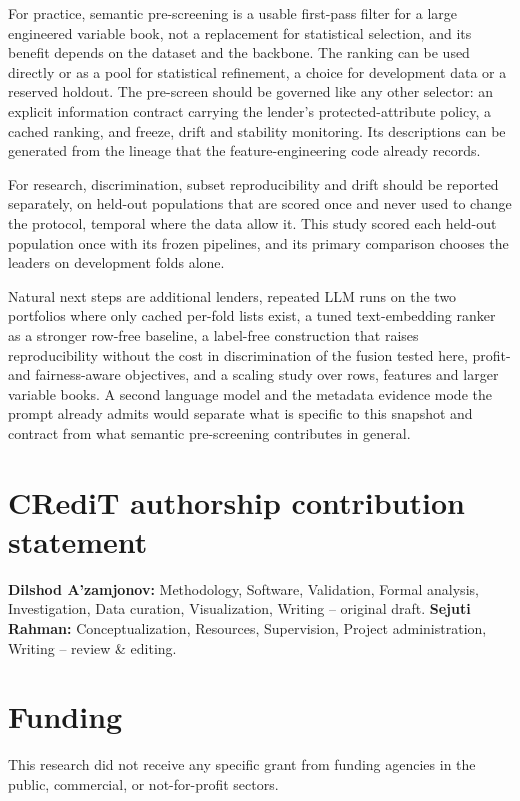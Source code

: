 \documentclass[final,5p,twocolumn]{elsarticle}
\begin{document}
For practice, semantic pre-screening is a usable first-pass filter for a large engineered variable book, not a replacement for statistical selection, and its benefit depends on the dataset and the backbone. The ranking can be used directly or as a pool for statistical refinement, a choice for development data or a reserved holdout. The pre-screen should be governed like any other selector: an explicit information contract carrying the lender's protected-attribute policy, a cached ranking, and freeze, drift and stability monitoring. Its descriptions can be generated from the lineage that the feature-engineering code already records.

For research, discrimination, subset reproducibility and drift should be reported separately, on held-out populations that are scored once and never used to change the protocol, temporal where the data allow it. This study scored each held-out population once with its frozen pipelines, and its primary comparison chooses the leaders on development folds alone.

Natural next steps are additional lenders, repeated LLM runs on the two portfolios where only cached per-fold lists exist, a tuned text-embedding ranker as a stronger row-free baseline, a label-free construction that raises reproducibility without the cost in discrimination of the fusion tested here, profit- and fairness-aware objectives, and a scaling study over rows, features and larger variable books. A second language model and the metadata evidence mode the prompt already admits would separate what is specific to this snapshot and contract from what semantic pre-screening contributes in general.


\section*{CRediT authorship contribution statement}
\textbf{Dilshod A'zamjonov:} Methodology, Software, Validation, Formal analysis, Investigation, Data curation, Visualization, Writing -- original draft. \textbf{Sejuti Rahman:} Conceptualization, Resources, Supervision, Project administration, Writing -- review \& editing.

\section*{Funding}
This research did not receive any specific grant from funding agencies in the public, commercial, or not-for-profit sectors.
\end{document}
